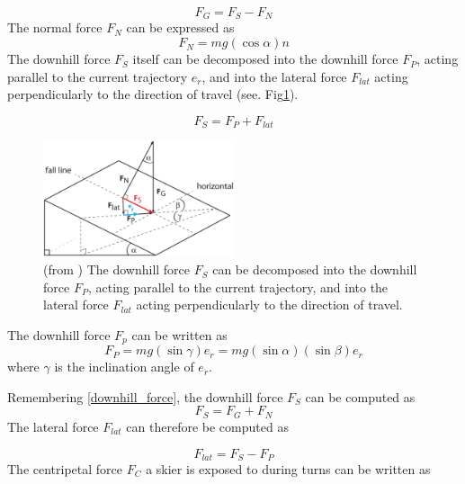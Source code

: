 \documentclass[12pt,a4paper,twoside]{book}
\begin{document}
\begin{equation}\label{downhill_force}
F_G=F_S-F_N
\end{equation}
The normal force $F_N$ can be expressed as
\begin{equation}
F_N=mg(\cos \alpha )n
\end{equation}
The downhill force $F_S$ itself can be decomposed into the downhill force $F_P$, acting parallel to the current trajectory $e_{\dot{r}}$, and into the lateral force $F_{lat}$ acting perpendicularly to the direction of travel (see. Fig\ref{downhill_force_pic}).

\begin{equation}
F_S=F_P+F_{lat}
\end{equation}
\begin{figure}[!ht]
  \begin{center}
    \includegraphics[width=0.5\textwidth]{images/figure5.eps}
    \caption{(from \cite{hol2012}) The downhill force $F_S$ can be decomposed into the downhill force $F_P$, acting parallel to the current trajectory, and into the lateral force $F_{lat}$ acting perpendicularly to the direction of travel.}\label{downhill_force_pic}
  \end{center}
\end{figure}

The downhill force $F_p$ can be written as
\begin{equation}
F_P=mg ( \sin \gamma ) e_{\dot{r}}=mg ( \sin \alpha ) ( \sin \beta ) e_{\dot{r}}
\end{equation}
where $\gamma$ is the inclination angle of $e_{\dot{r}}$.

Remembering \ref{downhill_force}, the downhill force $F_S$ can be computed as
\begin{equation}
F_S=F_G+F_N
\end{equation}
The lateral force $F_{lat}$ can therefore be computed as

\begin{equation}
F_{lat}=F_S-F_P
\end{equation}
The centripetal force $F_C$ a skier is exposed to during turns can be written as
\end{document}
